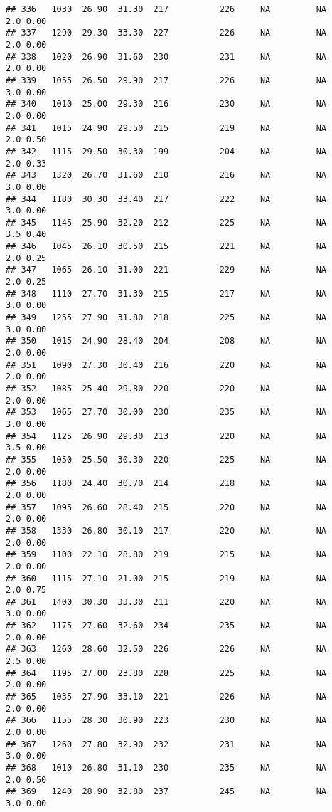 \documentclass[
]{article}
\begin{document}
\begin{verbatim}
## 336   1030  26.90  31.30  217          226     NA         NA     2.0 0.00
## 337   1290  29.30  33.30  227          226     NA         NA     2.0 0.00
## 338   1020  26.90  31.60  230          231     NA         NA     2.0 0.00
## 339   1055  26.50  29.90  217          226     NA         NA     3.0 0.00
## 340   1010  25.00  29.30  216          230     NA         NA     2.0 0.00
## 341   1015  24.90  29.50  215          219     NA         NA     2.0 0.50
## 342   1115  29.50  30.30  199          204     NA         NA     2.0 0.33
## 343   1320  26.70  31.60  210          216     NA         NA     3.0 0.00
## 344   1180  30.30  33.40  217          222     NA         NA     3.0 0.00
## 345   1145  25.90  32.20  212          225     NA         NA     3.5 0.40
## 346   1045  26.10  30.50  215          221     NA         NA     2.0 0.25
## 347   1065  26.10  31.00  221          229     NA         NA     2.0 0.25
## 348   1110  27.70  31.30  215          217     NA         NA     3.0 0.00
## 349   1255  27.90  31.80  218          225     NA         NA     3.0 0.00
## 350   1015  24.90  28.40  204          208     NA         NA     2.0 0.00
## 351   1090  27.30  30.40  216          220     NA         NA     2.0 0.00
## 352   1085  25.40  29.80  220          220     NA         NA     2.0 0.00
## 353   1065  27.70  30.00  230          235     NA         NA     3.0 0.00
## 354   1125  26.90  29.30  213          220     NA         NA     3.5 0.00
## 355   1050  25.50  30.30  220          225     NA         NA     2.0 0.00
## 356   1180  24.40  30.70  214          218     NA         NA     2.0 0.00
## 357   1095  26.60  28.40  215          220     NA         NA     2.0 0.00
## 358   1330  26.80  30.10  217          220     NA         NA     2.0 0.00
## 359   1100  22.10  28.80  219          215     NA         NA     2.0 0.00
## 360   1115  27.10  21.00  215          219     NA         NA     2.0 0.75
## 361   1400  30.30  33.30  211          220     NA         NA     3.0 0.00
## 362   1175  27.60  32.60  234          235     NA         NA     2.0 0.00
## 363   1260  28.60  32.50  226          226     NA         NA     2.5 0.00
## 364   1195  27.00  23.80  228          225     NA         NA     2.0 0.00
## 365   1035  27.90  33.10  221          226     NA         NA     2.0 0.00
## 366   1155  28.30  30.90  223          230     NA         NA     2.0 0.00
## 367   1260  27.80  32.90  232          231     NA         NA     3.0 0.00
## 368   1010  26.80  31.10  230          235     NA         NA     2.0 0.50
## 369   1240  28.90  32.80  237          245     NA         NA     3.0 0.00

\end{verbatim}
\end{document}
